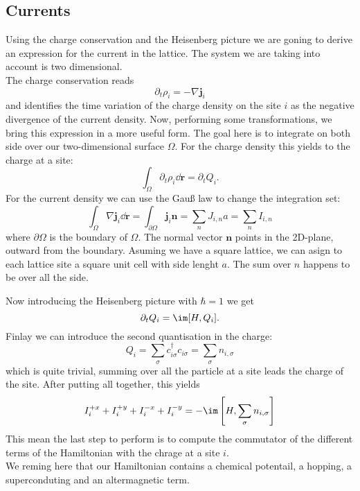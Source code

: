 \documentclass[../main.tex]{subfile}
\begin{document}
\subsection{Currents}
Using the charge conservation and the Heisenberg picture we are goning to derive an expression
for the current in the lattice. The system we are taking into account is two dimensional.\\

The charge conservation reads
\[
    \partial_t \rho_i = - \nabla \bm{j}_i
\]
and identifies the time variation of the charge density on the site $i$ as the negative divergence of the current density.
Now, performing some transformations, we bring this expression in a more useful form. The goal here is to integrate on both 
side over our two-dimensional surface $\Omega$. For the charge density this yields to the charge at a site:
\[
    \int_{\Omega} \partial_t \rho_i \dd \bm{r} = \partial_t Q_i .
\]
For the current density we can use the Gauß law to change the integration set:
\[
    \int_{\Omega} \nabla \bm{j}_i \dd \bm{r} = \int_{\partial \Omega} \bm{j}_i \bm{n} = \sum_{n} J_{i,n} a = \sum_{n} I_{i,n}
\]
where $\partial \Omega$ is the boundary of $\Omega$. The normal vector $\bm{n}$ points in the 2D-plane, outward from the boundary.
Asuming we have a square lattice, we can asign to each lattice site a square
unit cell with side lenght $a$. The sum over $n$ happens to be over all the side.

Now introducing the Heisenberg picture with $\hbar = 1$ we get
\[
    \partial_t Q_i = \im [H, Q_i].
\]
Finlay we can introduce the second quantisation in the charge:
\[
    Q_i = \sum_{\sigma} c_{i\sigma}^{\dagger}  c_{i\sigma} = \sum_{\sigma} n_{i,\sigma}
\]
which is quite trivial, summing over all the particle at a site leads the charge of the site. After putting all together, this yields
\begin{equation}\label{eq:CurrentSidesCommutator}
 I_{i}^{+x} +  I_{i}^{+y} +  I_{i}^{-x} +  I_{i}^{-y} = -\im \left[H, \sum_{\sigma} n_{i,\sigma}\right]
\end{equation}
This mean the last step to perform is to compute the commutator of the different terms of the Hamiltonian with the chrage at a site $i$.\\
We reming here that our Hamiltonian contains a chemical potentail, a hopping, a superconduting and an altermagnetic term.
\end{document}
